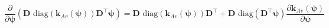 \begin{equation}
\label{eq:richards-newton-deriv-detail}
\frac{\partial}{\partial\boldsymbol{\psi}}
\left(
\mathbf{D}
    \text{ diag}\left(\mathbf{k}_{Av}(\boldsymbol{\psi})\right)
\mathbf{D}^{\top} \boldsymbol{\psi}
\right)
=
\mathbf{D}
    \text{ diag}\left(\mathbf{k}_{Av}(\boldsymbol{\psi})\right)
\mathbf{D}^{\top}
+
\mathbf{D}
    \text{ diag}\left(\mathbf{D}^{\top}\boldsymbol{\psi}\right)
\frac{\partial\mathbf{k}_{Av}(\boldsymbol{\psi})}{\partial\boldsymbol{\psi}}
\end{equation}
